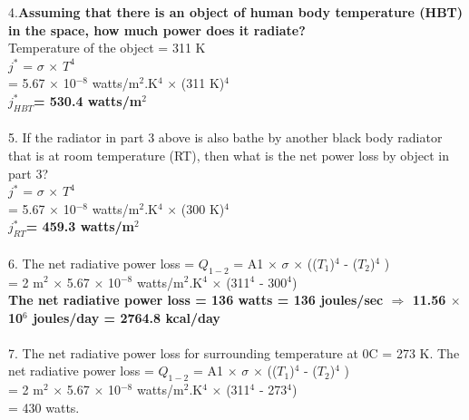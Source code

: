 \documentclass[11pt]{exam}
\begin{document}
\begin{questions}
{\begin{minipage}{42em}
                   4.\textbf {Assuming that there is an object of human body temperature (HBT) in the space, how much power does it radiate?} \\
                    Temperature of the object = 311 K \\
                    $j^{*}$ = $\sigma$ $\times$ $T^{4}$ \\
                            = 5.67 $\times$ 10$^{-8}$ watts/m$^{2}$.K$^{4}$ $\times$ (311 K)$^{4}$ \\
                   \textbf{$j^{*}_{HBT}$= 530.4 watts/m$^{2}$} \\ \\
                   5. If the radiator in part 3 above is also bathe by another black body radiator that is at room temperature (RT), then what is the net power loss by object in part 3? \\
         $j^{*}$ = $\sigma$ $\times$ $T^{4}$ \\
                 = 5.67 $\times$ 10$^{-8}$ watts/m$^{2}$.K$^{4}$ $\times$ (300 K)$^{4}$ \\ \textbf{$j^{*}_{RT}$= 459.3 watts/m$^{2}$} \\ \\ 
                   6. The net radiative power loss = $Q_{1-2}$ = A1 $\times$ $\sigma$ $\times$ (($T_{1}$)$^{4}$ - ($T_{2}$)$^{4}$ ) \\
                                                   = 2 m$^{2}$ $\times$ 5.67 $\times$ 10$^{-8}$ watts/m$^{2}$.K$^{4}$ $\times$ (311$^{4}$ - 300$^{4}$) \\
                      \textbf{The net radiative power loss = 136 watts = 136 joules/sec  $\Rightarrow$ 11.56 $\times$ 10$^{6}$ joules/day = 2764.8 kcal/day} \\ \\                      
                   7. The net radiative power loss for surrounding temperature at 0\textdegree{}C = 273 K.
                   The net radiative power loss = $Q_{1-2}$ = A1 $\times$ $\sigma$ $\times$ (($T_{1}$)$^{4}$ - ($T_{2}$)$^{4}$ ) \\
                                                   = 2 m$^{2}$ $\times$ 5.67 $\times$ 10$^{-8}$ watts/m$^{2}$.K$^{4}$ $\times$ (311$^{4}$ - 273$^{4}$) \\
                                                   = 430 watts.
                                                   

\end{minipage}}
\end{questions}
\end{document}
